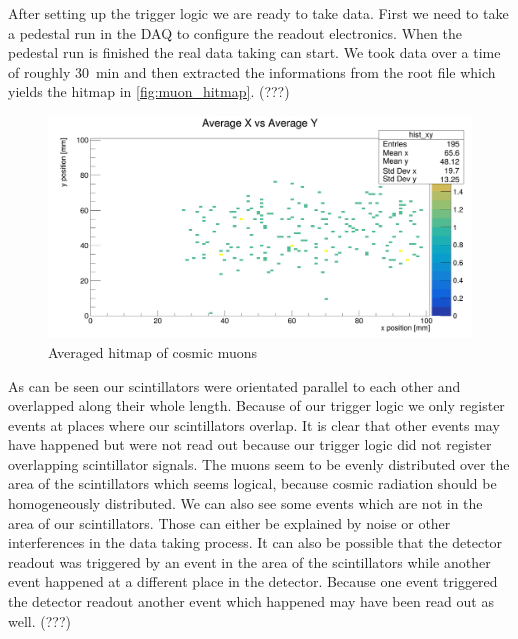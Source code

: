\documentclass[sn-mathphys-num,iicol]{sn-jnl}
\theoremstyle{thmstyleone}
\theoremstyle{thmstyletwo}
\theoremstyle{thmstylethree}
\begin{document}
After setting up the trigger logic we are ready to take data. First we need to take a pedestal run in the DAQ to configure the readout electronics.
When the pedestal run is finished the real data taking can start. 
We took data over a time of roughly \SI{30}{\minute} and then extracted the informations from the root file which yields the hitmap in \autoref{fig:muon_hitmap}. (???) %

\begin{figure}
  \includegraphics[width=\linewidth]{../src/elsa/finished_plots/muon_hitmap_avg.png}
  \caption{Averaged hitmap of cosmic muons}
  \label{fig:muon_hitmap}
\end{figure}

As can be seen our scintillators were orientated parallel to each other and overlapped along their whole length.
Because of our trigger logic we only register events at places where our scintillators overlap. 
It is clear that other events may have happened but were not read out because our trigger logic did not register overlapping scintillator signals.
The muons seem to be evenly distributed over the area of the scintillators which seems logical, because cosmic radiation should be homogeneously distributed.
We can also see some events which are not in the area of our scintillators. 
Those can either be explained by noise or other interferences in the data taking process.
It can also be possible that the detector readout was triggered by an event in the area of the scintillators while another event happened at a different place in the detector.
Because one event triggered the detector readout another event which happened may have been read out as well.
(???)

\end{document}
